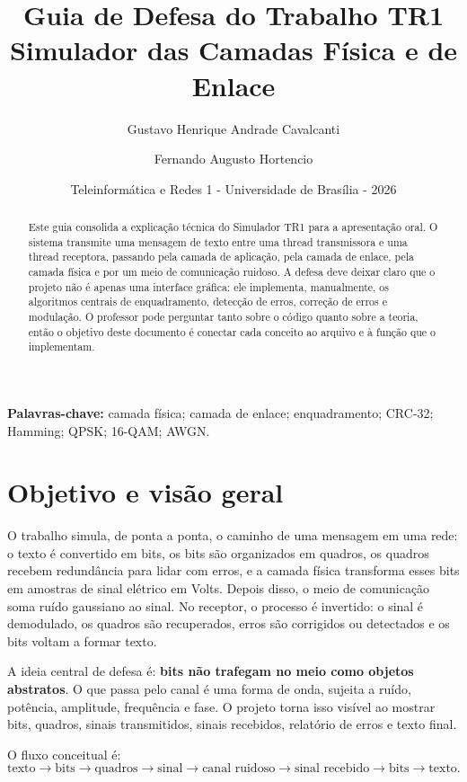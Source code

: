 \documentclass[10pt,a4paper]{article}
\title{\vspace{-1.1cm}\textbf{Guia de Defesa do Trabalho TR1}\\
\large Simulador das Camadas Física e de Enlace}
\author{Gustavo Henrique Andrade Cavalcanti \and Fernando Augusto Hortencio}
\date{Teleinformática e Redes 1 - Universidade de Brasília - 2026}
\begin{document}
\maketitle
\vspace{-0.65cm}

\begin{abstract}
Este guia consolida a explicação técnica do Simulador TR1 para a apresentação oral. O sistema transmite uma mensagem de texto entre uma thread transmissora e uma thread receptora, passando pela camada de aplicação, pela camada de enlace, pela camada física e por um meio de comunicação ruidoso. A defesa deve deixar claro que o projeto não é apenas uma interface gráfica: ele implementa, manualmente, os algoritmos centrais de enquadramento, detecção de erros, correção de erros e modulação. O professor pode perguntar tanto sobre o código quanto sobre a teoria, então o objetivo deste documento é conectar cada conceito ao arquivo e à função que o implementam.
\end{abstract}

\textbf{Palavras-chave:} camada física; camada de enlace; enquadramento; CRC-32; Hamming; QPSK; 16-QAM; AWGN.

\section{Objetivo e visão geral}

O trabalho simula, de ponta a ponta, o caminho de uma mensagem em uma rede: o texto é convertido em bits, os bits são organizados em quadros, os quadros recebem redundância para lidar com erros, e a camada física transforma esses bits em amostras de sinal elétrico em Volts. Depois disso, o meio de comunicação soma ruído gaussiano ao sinal. No receptor, o processo é invertido: o sinal é demodulado, os quadros são recuperados, erros são corrigidos ou detectados e os bits voltam a formar texto.

A ideia central de defesa é: \textbf{bits não trafegam no meio como objetos abstratos}. O que passa pelo canal é uma forma de onda, sujeita a ruído, potência, amplitude, frequência e fase. O projeto torna isso visível ao mostrar bits, quadros, sinais transmitidos, sinais recebidos, relatório de erros e texto final.

O fluxo conceitual é:
\[
\text{texto} \rightarrow \text{bits} \rightarrow \text{quadros} \rightarrow \text{sinal} \rightarrow \text{canal ruidoso} \rightarrow \text{sinal recebido} \rightarrow \text{bits} \rightarrow \text{texto}.
\]
\end{document}
